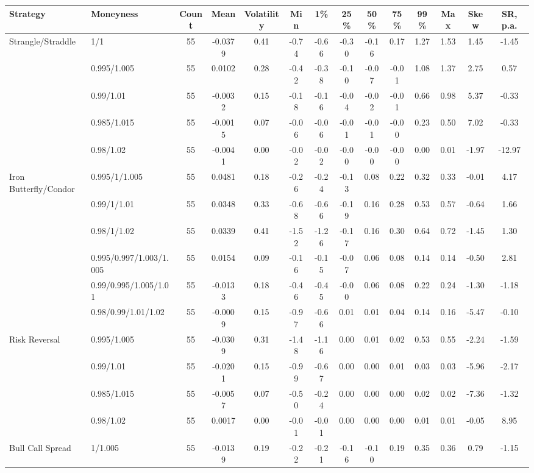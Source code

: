 \begin{tabular}{llcccccccccccc}
\toprule
Strategy & Moneyness & Count & Mean & Volatility & Min & 1\% & 25\% & 50\% & 75\% & 99\% & Max & Skew & SR, p.a. \\
\midrule
Strangle/Straddle & 1/1 & 55 & -0.0379 & 0.41 & -0.74 & -0.66 & -0.30 & -0.16 & 0.17 & 1.27 & 1.53 & 1.45 & -1.45 \\
 & 0.995/1.005 & 55 & 0.0102 & 0.28 & -0.42 & -0.38 & -0.10 & -0.07 & -0.01 & 1.08 & 1.37 & 2.75 & 0.57 \\
 & 0.99/1.01 & 55 & -0.0032 & 0.15 & -0.18 & -0.16 & -0.04 & -0.02 & -0.01 & 0.66 & 0.98 & 5.37 & -0.33 \\
 & 0.985/1.015 & 55 & -0.0015 & 0.07 & -0.06 & -0.06 & -0.01 & -0.01 & -0.00 & 0.23 & 0.50 & 7.02 & -0.33 \\
 & 0.98/1.02 & 55 & -0.0041 & 0.00 & -0.02 & -0.02 & -0.00 & -0.00 & -0.00 & 0.00 & 0.01 & -1.97 & -12.97 \\
Iron Butterfly/Condor & 0.995/1/1.005 & 55 & 0.0481 & 0.18 & -0.26 & -0.24 & -0.13 & 0.08 & 0.22 & 0.32 & 0.33 & -0.01 & 4.17 \\
 & 0.99/1/1.01 & 55 & 0.0348 & 0.33 & -0.68 & -0.66 & -0.19 & 0.16 & 0.28 & 0.53 & 0.57 & -0.64 & 1.66 \\
 & 0.98/1/1.02 & 55 & 0.0339 & 0.41 & -1.52 & -1.26 & -0.17 & 0.16 & 0.30 & 0.64 & 0.72 & -1.45 & 1.30 \\
 & 0.995/0.997/1.003/1.005 & 55 & 0.0154 & 0.09 & -0.16 & -0.15 & -0.07 & 0.06 & 0.08 & 0.14 & 0.14 & -0.50 & 2.81 \\
 & 0.99/0.995/1.005/1.01 & 55 & -0.0133 & 0.18 & -0.46 & -0.45 & -0.00 & 0.06 & 0.08 & 0.22 & 0.24 & -1.30 & -1.18 \\
 & 0.98/0.99/1.01/1.02 & 55 & -0.0009 & 0.15 & -0.97 & -0.66 & 0.01 & 0.01 & 0.04 & 0.14 & 0.16 & -5.47 & -0.10 \\
Risk Reversal & 0.995/1.005 & 55 & -0.0309 & 0.31 & -1.48 & -1.16 & 0.00 & 0.01 & 0.02 & 0.53 & 0.55 & -2.24 & -1.59 \\
 & 0.99/1.01 & 55 & -0.0201 & 0.15 & -0.99 & -0.67 & 0.00 & 0.00 & 0.01 & 0.03 & 0.03 & -5.96 & -2.17 \\
 & 0.985/1.015 & 55 & -0.0057 & 0.07 & -0.50 & -0.24 & 0.00 & 0.00 & 0.00 & 0.02 & 0.02 & -7.36 & -1.32 \\
 & 0.98/1.02 & 55 & 0.0017 & 0.00 & -0.01 & -0.01 & 0.00 & 0.00 & 0.00 & 0.01 & 0.01 & -0.05 & 8.95 \\
Bull Call Spread & 1/1.005 & 55 & -0.0139 & 0.19 & -0.22 & -0.21 & -0.16 & -0.10 & 0.19 & 0.35 & 0.36 & 0.79 & -1.15 \\

\end{tabular}
